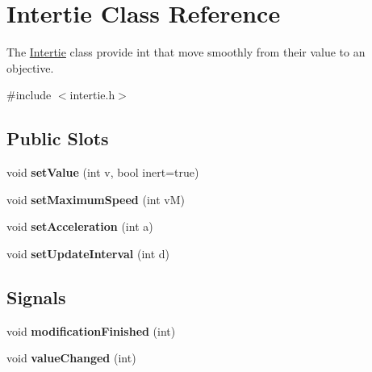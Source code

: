 \hypertarget{class_intertie}{\section{\-Intertie \-Class \-Reference}
\label{class_intertie}
}


\-The \hyperlink{class_intertie}{\-Intertie} class provide int that move smoothly from their value to an objective.  




{\ttfamily \#include $<$intertie.\-h$>$}

\subsection*{\-Public \-Slots}
\begin{DoxyCompactItemize}
\item 
\hypertarget{class_intertie_adc4c0f1797d74c01cbe0fed9bc2763ec}{void {\bfseries set\-Value} (int v, bool inert=true)}\label{class_intertie_adc4c0f1797d74c01cbe0fed9bc2763ec}

\item 
\hypertarget{class_intertie_abfd23bc0f2d764bd58997c578c2fad79}{void {\bfseries set\-Maximum\-Speed} (int v\-M)}\label{class_intertie_abfd23bc0f2d764bd58997c578c2fad79}

\item 
\hypertarget{class_intertie_a8911421634e9ec99cf762060f68b8d5e}{void {\bfseries set\-Acceleration} (int a)}\label{class_intertie_a8911421634e9ec99cf762060f68b8d5e}

\item 
\hypertarget{class_intertie_aae62fc52ccd30f0d4606c611a9b5aea8}{void {\bfseries set\-Update\-Interval} (int d)}\label{class_intertie_aae62fc52ccd30f0d4606c611a9b5aea8}

\end{DoxyCompactItemize}
\subsection*{\-Signals}
\begin{DoxyCompactItemize}
\item 
\hypertarget{class_intertie_a6723ac2faa801421b291b9a2b289aedf}{void {\bfseries modification\-Finished} (int)}\label{class_intertie_a6723ac2faa801421b291b9a2b289aedf}

\item 
\hypertarget{class_intertie_ac704099264fb03441f959297513b9f04}{void {\bfseries value\-Changed} (int)}\label{class_intertie_ac704099264fb03441f959297513b9f04}

\end{DoxyCompactItemize}
